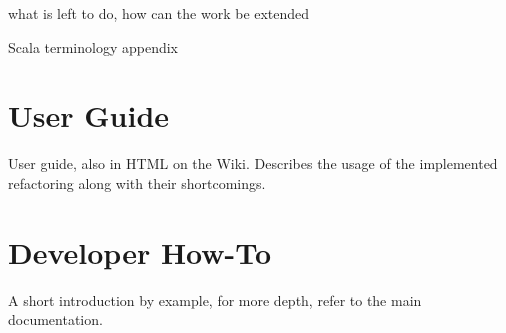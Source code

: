 \documentclass[10pt,a4paper,oneside]{scrreprt}
\begin{document}
what is left to do, how can the work be extended

\appendix

Scala terminology appendix

\chapter{User Guide}

User guide, also in HTML on the Wiki. Describes the usage of the implemented refactoring along with their shortcomings.

\chapter{Developer How-To}

A short introduction by example, for more depth, refer to the main documentation.




\clearpage
\bib
\end{document}
